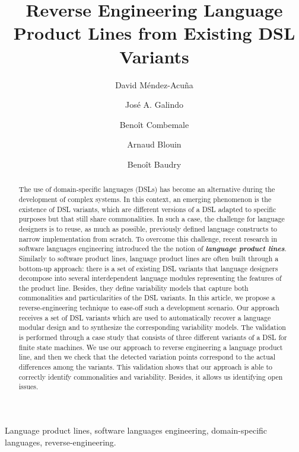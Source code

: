 \documentclass[preprint,5p]{elsarticle}
\begin{document}
\begin{frontmatter}

\title{Reverse Engineering Language Product Lines from Existing DSL Variants}

\author{David M\'endez-Acu\~na}

\author{Jos\'e A. Galindo}

\author{Beno\^it Combemale}

\author{Arnaud Blouin}

\author{Beno\^it Baudry}

\address{INRIA/IRISA and University of Rennes 1, France}

\begin{abstract}
The use of domain-specific languages (DSLs) has become an alternative during the development of complex systems. In this context, an emerging phenomenon is the existence of DSL variants, which are different versions of a DSL adapted to specific purposes but that still share commonalities. In such a case, the challenge for language designers is to reuse, as much as possible, previously defined language constructs to narrow implementation from scratch. To overcome this challenge, recent research in software languages engineering introduced the the notion of \textit{\textbf{language product lines}}. Similarly to software product lines, language product lines are often built through a bottom-up approach: there is a set of existing DSL variants that language designers decompose into several interdependent language modules representing the features of the product line. Besides, they define variability models that capture both commonalities and particularities of the DSL variants. In this article, we propose a reverse-engineering technique to ease-off such a development scenario. Our approach receives a set of DSL variants which are used to automatically recover a language modular design and to synthesize the corresponding variability models. The validation is performed through a case study that consists of three different variants of a DSL for finite state machines. We use our approach to reverse engineering a language product line, and then we check that the detected variation points correspond to the actual differences among the variants. This validation shows that our approach is able to correctly identify commonalities and variability. Besides, it allows us identifying open issues.

\end{abstract}

\begin{keyword}
Language product lines, software languages engineering, domain-specific languages, reverse-engineering.
\end{keyword}

\end{frontmatter}
\end{document}
